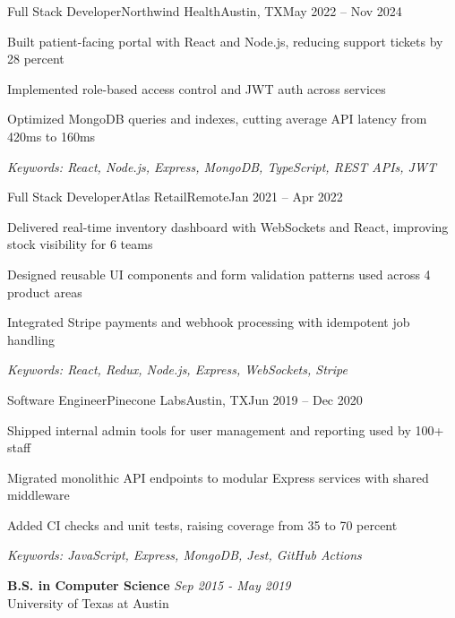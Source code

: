 \documentclass[11pt,a4paper]{article}
\begin{document}
\makecvheader
\makecontactinfo


\begin{internship}{Full Stack Developer}{Northwind Health}{Austin, TX}{May 2022 -- Nov 2024}{}
  \item Built patient-facing portal with React and Node.js, reducing support tickets by 28 percent
  \item Implemented role-based access control and JWT auth across services
  \item Optimized MongoDB queries and indexes, cutting average API latency from 420ms to 160ms
  \item[] \textit{\footnotesize Keywords: React, Node.js, Express, MongoDB, TypeScript, REST APIs, JWT}
\end{internship}

\begin{internship}{Full Stack Developer}{Atlas Retail}{Remote}{Jan 2021 -- Apr 2022}{}
  \item Delivered real-time inventory dashboard with WebSockets and React, improving stock visibility for 6 teams
  \item Designed reusable UI components and form validation patterns used across 4 product areas
  \item Integrated Stripe payments and webhook processing with idempotent job handling
  \item[] \textit{\footnotesize Keywords: React, Redux, Node.js, Express, WebSockets, Stripe}
\end{internship}

\begin{internship}{Software Engineer}{Pinecone Labs}{Austin, TX}{Jun 2019 -- Dec 2020}{}
  \item Shipped internal admin tools for user management and reporting used by 100+ staff
  \item Migrated monolithic API endpoints to modular Express services with shared middleware
  \item Added CI checks and unit tests, raising coverage from 35 to 70 percent
  \item[] \textit{\footnotesize Keywords: JavaScript, Express, MongoDB, Jest, GitHub Actions}
\end{internship}

\textbf{B.S. in Computer Science} \hfill \textit{Sep 2015 - May 2019}\\[-2pt]
University of Texas at Austin
\end{document}
